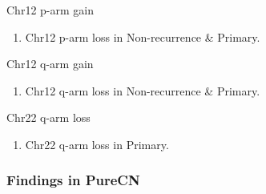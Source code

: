 \documentclass{beamer}
\begin{document}
\begin{frame}[allowframebreaks]
        \begin{block}{Chr12 p-arm gain}
            \begin{enumerate}
                \item Chr12 p-arm loss in Non-recurrence \& Primary.
            \end{enumerate}

            \begin{table}
                \caption{CGC Tier1 genes in Chr12 p-arm}
                \resizebox{\linewidth}{!}
                {}
            \end{table}
        \end{block}

        \begin{block}{Chr12 q-arm gain}
            \begin{enumerate}
                \item Chr12 q-arm loss in Non-recurrence \& Primary.
            \end{enumerate}

            \begin{table}
                \caption{CGC Tier1 genes in Chr12 q-arm}
                \resizebox{\linewidth}{!}
                {}
            \end{table}
        \end{block}

        \begin{block}{Chr22 q-arm loss}
            \begin{enumerate}
                \item Chr22 q-arm loss in Primary.
            \end{enumerate}

            \begin{table}
                \caption{CGC Tier1 genes in Chr22 q-arm}
                \resizebox{\linewidth}{!}
                {}
            \end{table}
        \end{block}
    \end{frame}

    \begin{frame}
        \frametitle{Findings in PureCN}
    \end{frame}
\end{document}
